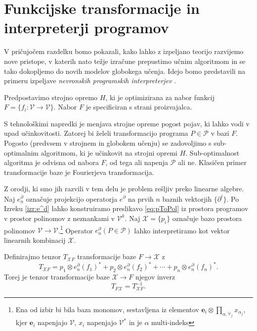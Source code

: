 \documentclass[a4paper, 12pt]{book}
\newcommand{\VV}{\mathcal{V}}
\newcommand{\e}{\mathbf{e}}
\newcommand{\X}{\mathcal{X}}
\newcommand{\dP}{\mathcal{P}}
\newcommand{\D}{\partial}
\begin{document}
\section{Funkcijske transformacije in interpreterji programov}\label{sec:FunTrans}

V pričujočem razdelku bomo pokazali, kako lahko z izpeljano teorijo razvijemo nove pristope, v katerih nato težje izračune prepustimo učnim algoritmom in se tako dokopljemo do novih modelov globokega učenja. Idejo bomo predstavili na primeru izpeljave \emph{nevronskih programskih interpreterjev} \cite{progInterp}.

Predpostavimo strojno opremo $H$, ki je optimizirana za nabor funkcij
   $F=\{f_i:\VV\to \VV\}$. Nabor $F$ je specificiran s strani proizvajalca.  
   
   S tehnološkimi napredki je menjava strojne opreme pogost pojav, ki lahko vodi v upad učinkovitosti. Zatorej bi želeli transformacijo programa $P\in\dP$ v bazi $F$. Pogosto (predvsem v strojnem in globokem učenju) se zadovoljimo s sub-optimalnim algoritmom, ki je učinkovit na strojni opremi $H$. Sub-optimalnost algoritma je odvisna od nabora $F$, od tega ali napenja $\dP$ ali ne. Klasičen primer transformacije baze je Fourierjeva transformacija.

Z orodji, ki smo jih razvili v tem delu je problem rešljiv preko linearne algebre. Naj $e^\D_n$ označuje projekcijo operatorja $e^\D$ na prvih $n$ baznih vektorjih $\{\D^i\}$. Po Izreku \ref{izr:e^d} lahko konstruiramo preslikavo \eqref{eq:pToPol} iz prostora programov v prostor polinomov z neznankami v $\VV^k$. Naj $\X=\{p_i\}$ označuje bazo prostora polinomov $\VV\to \VV$.\footnote{Ena od izbir bi bila baza monomov,
sestavljena iz elementov  $\e_i\otimes\prod\limits_{\alpha,\forall_j}
   x_{\alpha_j}$, kjer $\e_i$ napenjajo $\VV$, $x_i$ napenjajo $\VV^*$ in je $\alpha$
   multi-indeks} Operator $e^\D_n(P\in\dP)$ lahko interpretiramo kot vektor linearnih kombinacij $\X$.
   
Definirajmo tenzor $T_{\X F}$ transformacije baze $F\to\X$ z
  \begin{equation}\label{eq:matTransF}
  T_{\X F}=
  p_1\otimes e_n^\D(f_1)^* + p_2\otimes e_n^\D(f_2)^* + \cdots + p_n\otimes e_n^\D(f_n)^*.
  \end{equation}
Torej je tenzor transformacije baze $\X\to F$ njegov inverz
  \begin{equation}\label{eq:matTrans}
  T_{F\X}=T_{\X F}^{-1}.
  \end{equation}
  
\end{document}
